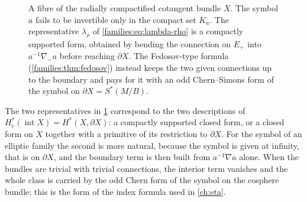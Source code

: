 \begin{figure}[ht]
\centering
{}
\caption[The relative Chern character]{A fibre of the radially compactified
cotangent bundle $X$. The symbol $a$ fails to be invertible only in the compact set
$K_a$. The representative $\lambda_\rho$ of \eqref{families:eq:lambda-rho} is a
compactly supported form, obtained by bending the connection on $E_+$ into
$a^{-1}\nabla_-a$ before reaching $\partial X$. The Fedosov-type formula
(\cref{families:thm:fedosov}) instead keeps the two given connections up to the
boundary and pays for it with an odd Chern--Simons form of the symbol on
$\partial X=S^*(M/B)$.}
\label{families:fig:relative}
\end{figure}

\begin{discussion}
  The two representatives in \cref{families:fig:relative} correspond to the two
  descriptions of $H^*_{\mathrm c}(\operatorname{int}X)=H^*(X,\partial X)$: a
  compactly supported closed form, or a closed form on $X$ together with a
  primitive of its restriction to $\partial X$. For the symbol of an elliptic
  family the second is more natural, because the symbol is given at infinity,
  that is on $\partial X$, and the boundary term is then built from
  $a^{-1}\nabla a$ alone. When the bundles are trivial with trivial connections,
  the interior term vanishes and the whole class is carried by the odd Chern
  form of the symbol on the cosphere bundle; this is the form of the index formula
  used in \cref{ch:eta}.
\end{discussion}

